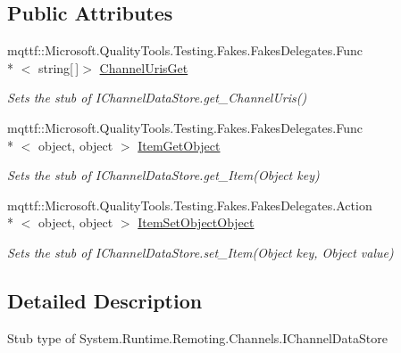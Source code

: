 \subsection*{Public Attributes}
\begin{DoxyCompactItemize}
\item 
mqttf\-::\-Microsoft.\-Quality\-Tools.\-Testing.\-Fakes.\-Fakes\-Delegates.\-Func\\*
$<$ string\mbox{[}$\,$\mbox{]}$>$ \hyperlink{class_system_1_1_runtime_1_1_remoting_1_1_channels_1_1_fakes_1_1_stub_i_channel_data_store_a224cf700ba6cef7a5f92e12a3bdda0a8}{Channel\-Uris\-Get}
\begin{DoxyCompactList}\small\item\em Sets the stub of I\-Channel\-Data\-Store.\-get\-\_\-\-Channel\-Uris()\end{DoxyCompactList}\item 
mqttf\-::\-Microsoft.\-Quality\-Tools.\-Testing.\-Fakes.\-Fakes\-Delegates.\-Func\\*
$<$ object, object $>$ \hyperlink{class_system_1_1_runtime_1_1_remoting_1_1_channels_1_1_fakes_1_1_stub_i_channel_data_store_a15716604b0bcd1ed5cd0a69063e0dcff}{Item\-Get\-Object}
\begin{DoxyCompactList}\small\item\em Sets the stub of I\-Channel\-Data\-Store.\-get\-\_\-\-Item(\-Object key)\end{DoxyCompactList}\item 
mqttf\-::\-Microsoft.\-Quality\-Tools.\-Testing.\-Fakes.\-Fakes\-Delegates.\-Action\\*
$<$ object, object $>$ \hyperlink{class_system_1_1_runtime_1_1_remoting_1_1_channels_1_1_fakes_1_1_stub_i_channel_data_store_a1811b40e6dae24addd5c9231aa2097f7}{Item\-Set\-Object\-Object}
\begin{DoxyCompactList}\small\item\em Sets the stub of I\-Channel\-Data\-Store.\-set\-\_\-\-Item(\-Object key, Object value)\end{DoxyCompactList}\end{DoxyCompactItemize}


\subsection{Detailed Description}
Stub type of System.\-Runtime.\-Remoting.\-Channels.\-I\-Channel\-Data\-Store



